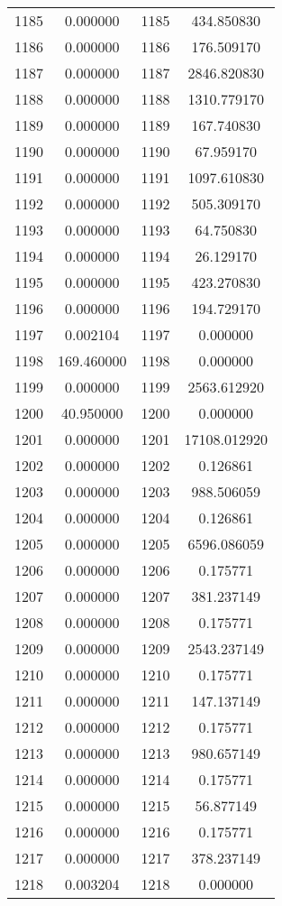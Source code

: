 \documentclass[12pt]{article}
\begin{document}
\begin{longtable}{@{}cccc@{}}
1185 & 0.000000 & 1185 & 434.850830 \\
1186 & 0.000000 & 1186 & 176.509170 \\
1187 & 0.000000 & 1187 & 2846.820830 \\
1188 & 0.000000 & 1188 & 1310.779170 \\
1189 & 0.000000 & 1189 & 167.740830 \\
1190 & 0.000000 & 1190 & 67.959170 \\
1191 & 0.000000 & 1191 & 1097.610830 \\
1192 & 0.000000 & 1192 & 505.309170 \\
1193 & 0.000000 & 1193 & 64.750830 \\
1194 & 0.000000 & 1194 & 26.129170 \\
1195 & 0.000000 & 1195 & 423.270830 \\
1196 & 0.000000 & 1196 & 194.729170 \\
1197 & 0.002104 & 1197 & 0.000000 \\
1198 & 169.460000 & 1198 & 0.000000 \\
1199 & 0.000000 & 1199 & 2563.612920 \\
1200 & 40.950000 & 1200 & 0.000000 \\
1201 & 0.000000 & 1201 & 17108.012920 \\
1202 & 0.000000 & 1202 & 0.126861 \\
1203 & 0.000000 & 1203 & 988.506059 \\
1204 & 0.000000 & 1204 & 0.126861 \\
1205 & 0.000000 & 1205 & 6596.086059 \\
1206 & 0.000000 & 1206 & 0.175771 \\
1207 & 0.000000 & 1207 & 381.237149 \\
1208 & 0.000000 & 1208 & 0.175771 \\
1209 & 0.000000 & 1209 & 2543.237149 \\
1210 & 0.000000 & 1210 & 0.175771 \\
1211 & 0.000000 & 1211 & 147.137149 \\
1212 & 0.000000 & 1212 & 0.175771 \\
1213 & 0.000000 & 1213 & 980.657149 \\
1214 & 0.000000 & 1214 & 0.175771 \\
1215 & 0.000000 & 1215 & 56.877149 \\
1216 & 0.000000 & 1216 & 0.175771 \\
1217 & 0.000000 & 1217 & 378.237149 \\
1218 & 0.003204 & 1218 & 0.000000 \\

\end{longtable}
\end{document}
